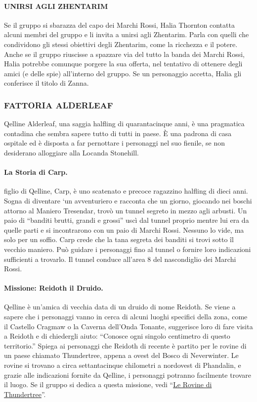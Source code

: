 \documentclass{article}
\begin{document}
\paragraph{UNIRSI AGLI ZHENTARIM}
Se il gruppo si sbarazza del capo dei Marchi Rossi, Halia
Thornton contatta alcuni membri del gruppo e li invita a
unirsi agli Zhentarim. Parla con quelli che condividono gli
stessi obiettivi degli Zhentarim, come la ricchezza e il potere.
Anche se il gruppo riuscisse a spazzare via del tutto la banda
dei Marchi Rossi, Halia potrebbe comunque porgere la sua
offerta, nel tentativo di ottenere degli amici (e delle spie)
all’interno del gruppo. Se un personaggio accetta, Halia gli
conferisce il titolo di Zanna.
\subsubsection{FATTORIA ALDERLEAF}
\hypertarget{fattoria}{}
Qelline Alderleaf, una saggia halfling di quarantacinque anni,
è una pragmatica contadina che sembra sapere tutto di tutti
in paese. È una padrona di casa ospitale ed è disposta a far
pernottare i personaggi nel suo fienile, se non desiderano
alloggiare alla Locanda Stonehill.
\paragraph{La Storia di Carp.}figlio di Qelline, Carp, è uno scatenato
e precoce ragazzino halfling di dieci anni. Sogna di diventare
‘un avventuriero e racconta che un giorno, giocando nei boschi
attorno al Maniero Tresendar, trovò un tunnel segreto in
mezzo agli arbusti. Un paio di “banditi brutti, grandi e grossi”
uscì dal tunnel proprio mentre lui era da quelle parti e si
incontrarono con un paio di Marchi Rossi. Nessuno lo vide, ma
solo per un soffio. Carp crede che la tana segreta dei banditi si
trovi sotto îl vecchio maniero. Può guidare i personaggi fino al
tunnel o fornire loro indicazioni sufficienti a trovarlo. Il tunnel
conduce all’area 8 del nascondiglio dei Marchi Rossi.
\paragraph{Missione: Reidoth il Druido.}
Qelline è un'amica di vecchia
data di un druido di nome Reidoth. Se viene a sapere che
i personaggi vanno in cerca di alcuni luoghi specifici della
zona, come il Castello Cragmaw o la Caverna dell’Onda
Tonante, suggerisce loro di fare visita a Reidoth e di chiedergli
aiuto: “Conosce ogni singolo centimetro di questo territorio.”
Spiega ai personaggi che Reidoth di recente è partito per
le rovine di un paese chiamato Thundertree, appena a
ovest del Bosco di Neverwinter. Le rovine si trovano a circa
settantacinque chilometri a nordovest di Phandalin, e grazie
alle indicazioni fornite da Qelline, i personaggi potranno
facilmente trovare il luogo. Se il gruppo si dedica a questa
missione, vedi “\hyperlink{rovine}{Le Rovine di Thundertree}”.
\end{document}
